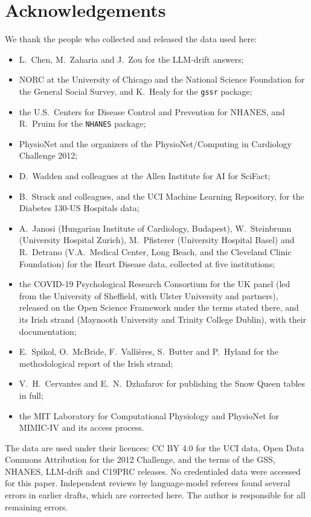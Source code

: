 \documentclass[11pt]{article}
\theoremstyle{definition}
\theoremstyle{remark}
\begin{document}
\section*{Acknowledgements}
We thank the people who collected and released the data used here:
\begin{itemize}[leftmargin=*,nosep]
\item L.~Chen, M.~Zaharia and J.~Zou for the LLM-drift answers;
\item NORC at the University of Chicago and the National Science Foundation for the General Social Survey, and K.~Healy for the
  \texttt{gssr} package;
\item the U.S.~Centers for Disease Control and Prevention for NHANES, and R.~Pruim for the \texttt{NHANES} package;
\item PhysioNet and the organizers of the PhysioNet/Computing in Cardiology Challenge 2012;
\item D.~Wadden and colleagues at the Allen Institute for AI for SciFact;
\item B.~Strack and colleagues, and the UCI Machine Learning Repository, for the Diabetes 130-US Hospitals data;
\item A.~Janosi (Hungarian Institute of Cardiology, Budapest), W.~Steinbrunn (University Hospital Zurich), M.~Pfisterer (University
  Hospital Basel) and R.~Detrano (V.A.~Medical Center, Long Beach, and the Cleveland Clinic Foundation) for the Heart Disease data, collected
  at five institutions;
\item the COVID-19 Psychological Research Consortium for the UK panel (led from the University of Sheffield, with Ulster University and
  partners), released on the Open Science Framework under the terms stated there, and its Irish strand (Maynooth University and Trinity
  College Dublin), with their documentation;
\item E.~Spikol, O.~McBride, F.~Valli\`eres, S.~Butter and P.~Hyland for the methodological report of the Irish strand;
\item V.~H.~Cervantes and E.~N.~Dzhafarov for publishing the Snow Queen tables in full;
\item the MIT Laboratory for Computational Physiology and PhysioNet for MIMIC-IV and its access process.
\end{itemize}
The data are used under their licences: CC BY 4.0 for the UCI data, Open Data Commons Attribution for the 2012 Challenge, and the terms of
the GSS, NHANES, LLM-drift and C19PRC releases. No credentialed data were accessed for this paper. Independent reviews by language-model
referees found several errors in earlier drafts, which are corrected here. The author is responsible for all remaining errors.
\end{document}
